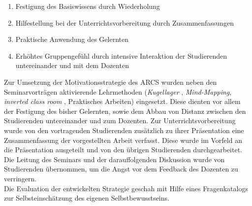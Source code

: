 \begin{enumerate}
\item Festigung des Basiswissens durch Wiederholung
\item Hilfestellung bei der Unterrichtsvorbereitung durch Zusammenfassungen
\item Praktische Anwendung des Gelernten
\item Erhöhtes Gruppengefühl durch intensive Interaktion der Studierenden untereinander und mit dem Dozenten
\end{enumerate}
Zur Umsetzung der Motivationsstrategie des ARCS wurden neben den Seminarvorträgen aktivierende Lehrmethoden ({\it Kugellager} \cite{Leisen.2003}, {\it Mind-Mapping}, {\it inverted class room} \cite{Uzunboylu.2015, AsksoyG.2016}, Praktisches Arbeiten) eingesetzt. Diese dienten vor allem der Festigung des bisher Gelernten, sowie dem Abbau von Distanz zwischen den Studierenden untereinander und zum Dozenten. Zur Unterrichtsvorbereitung wurde von den vortragenden Studierenden zusätzlich zu ihrer Präsentation eine Zusammenfassung der vorgestellten Arbeit verfasst. Diese wurde im Vorfeld an die Präsentation ausgeteilt und von den übrigen Studierenden durchgearbeitet. Die Leitung des Seminars und der darauffolgenden Diskussion wurde von Studierenden übernommen, um die Angst vor dem Feedback des Dozenten zu verringern.\\
\noindent
Die Evaluation der entwickelten Strategie geschah mit Hilfe eines Fragenkatalogs zur Selbsteinschätzung des eigenen Selbstbewusstseins.
